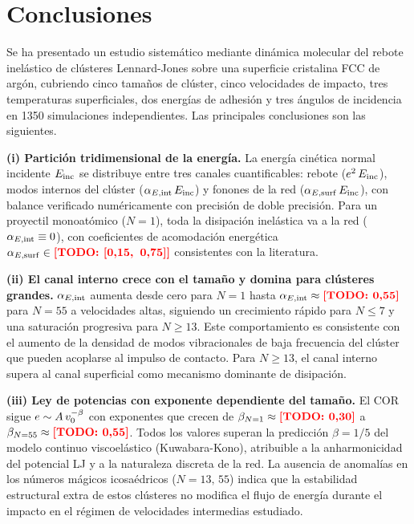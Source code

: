 \section{Conclusiones}
\label{sec:conclusiones}

Se ha presentado un estudio sistemático mediante dinámica molecular del rebote
inelástico de clústeres Lennard-Jones sobre una superficie cristalina FCC de
argón, cubriendo cinco tamaños de clúster, cinco velocidades de impacto, tres
temperaturas superficiales, dos energías de adhesión y tres ángulos de incidencia
en \num{1350} simulaciones independientes. Las principales conclusiones son las
siguientes.

\medskip\noindent
\textbf{(i) Partición tridimensional de la energía.}
La energía cinética normal incidente $E_{\mathrm{inc}}$ se distribuye entre tres canales
cuantificables: rebote ($e^2\,E_{\mathrm{inc}}$), modos internos del clúster
($\alpha_{E,\mathrm{int}}\,E_{\mathrm{inc}}$) y fonones de la red ($\alpha_{E,\mathrm{surf}}\,E_{\mathrm{inc}}$), con balance
verificado numéricamente con precisión de doble precisión. Para un proyectil
monoatómico ($N=1$), toda la disipación inelástica va a la red
($\alpha_{E,\mathrm{int}} \equiv 0$), con coeficientes de acomodación energética
$\alpha_{E,\mathrm{surf}} \in \textcolor{red}{\textbf{[TODO: [0{,}15,\, 0{,}75]]}}$ consistentes con la literatura.

\medskip\noindent
\textbf{(ii) El canal interno crece con el tamaño y domina para clústeres grandes.}
$\alpha_{E,\mathrm{int}}$ aumenta desde cero para $N=1$ hasta $\alpha_{E,\mathrm{int}} \approx \textcolor{red}{\textbf{[TODO: 0{,}55]}}$
para $N=55$ a velocidades altas, siguiendo un crecimiento rápido para $N \leq 7$
y una saturación progresiva para $N \geq 13$. Este comportamiento es consistente
con el aumento de la densidad de modos vibracionales de baja frecuencia del
clúster que pueden acoplarse al impulso de contacto. Para $N \geq 13$, el canal
interno supera al canal superficial como mecanismo dominante de disipación.

\medskip\noindent
\textbf{(iii) Ley de potencias con exponente dependiente del tamaño.}
El COR sigue $e \sim A\,v_0^{-\beta}$ con exponentes que crecen de
$\beta_{N=1} \approx \textcolor{red}{\textbf{[TODO: 0{,}30]}}$ a $\beta_{N=55} \approx \textcolor{red}{\textbf{[TODO: 0{,}55]}}$.
Todos los valores superan la predicción $\beta=1/5$ del modelo continuo
viscoelástico (Kuwabara-Kono), atribuible a la anharmonicidad del potencial
LJ y a la naturaleza discreta de la red. La ausencia de anomalías en los
números mágicos icosaédricos ($N=13,\, 55$) indica que la estabilidad
estructural extra de estos clústeres no modifica el flujo de energía durante
el impacto en el régimen de velocidades intermedias estudiado.

